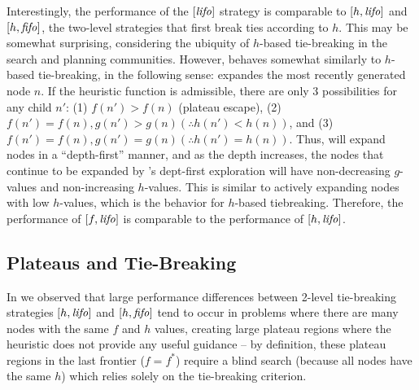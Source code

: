 Interestingly, the performance of the $[\mbox{\textit{lifo}}]$ strategy
is comparable to $[h,\mbox{\textit{lifo}}]$ and $[h,\mbox{\textit{fifo}}]$, the two-level strategies that first break ties according to $h$.
This may be somewhat surprising, considering the ubiquity of $h$-based tie-breaking in the search and planning communities.
% 
However, \lifo behaves somewhat similarly to $h$-based tie-breaking, in the following sense:
\lifo expandes the most recently generated node $n$.
If the heuristic function is admissible, there are only 3 possibilities for any child $n'$: 
(1) $f(n') > f(n)$  (plateau escape), 
(2) $f(n') = f(n), g(n') > g(n) (\therefore h(n') < h(n))$, and 
(3) $f(n') = f(n), g(n') = g(n) (\therefore h(n') = h(n))$.
Thus, \lifo will expand nodes in a ``depth-first'' manner, and as the depth increases,
the nodes that continue to be expanded by \lifo's 
dept-first exploration will have non-decreasing $g$-values and non-increasing $h$-values.
This is similar to actively expanding nodes with low $h$-values, which is the behavior for $h$-based tiebreaking.
Therefore, the performance of $[f,\mbox{\textit{lifo}}]$ is comparable to the performance of $[h,\mbox{\textit{lifo}}]$.


\subsection{Plateaus and Tie-Breaking}

In 
we observed that large performance differences between
2-level tie-breaking strategies $[h,\mbox{\textit{lifo}}]$ and $[h,\mbox{\textit{fifo}}]$ tend
to occur in problems where there are many nodes with the same $f$ and
$h$ values, creating large plateau regions where the heuristic does not
provide any useful guidance -- by definition, these plateau regions in
the last frontier ($f=f^*$) require a blind search (because all nodes
have the same $h$) which relies solely on the tie-breaking criterion.


